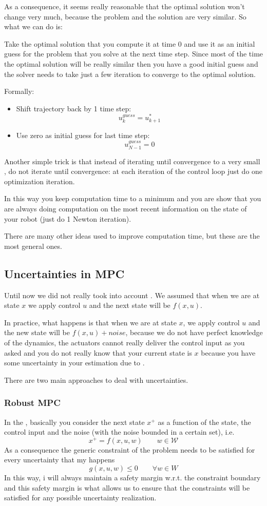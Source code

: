 As a consequence, it seems really reasonable that the optimal solution won't change very much, because the problem and the solution are very similar. So what we can do is:

Take the optimal solution that you compute it at time $0$ and use it as an initial guess for the problem that you solve at the next time step. Since most of the time the optimal solution will be really similar then you have a good initial guess and the solver needs to take just a few iteration to converge to the optimal solution.

Formally:
\begin{itemize}
\item Shift trajectory back by 1 time step:
\[u^{guess}_k = u^*_{k+1}\]
\item Use zero as initial guess for last time step:
\[u_{N-1}^{guess} = 0\]
\end{itemize}

Another simple trick is that instead of iterating until convergence to a very small , do not iterate until convergence: at each iteration of the control loop just do one optimization iteration.

In this way you keep computation time to a minimum and you are show that you are always doing computation on the most recent information on the state of your robot (just do 1 Newton iteration).

There are many other ideas used to improve computation time, but these are the most general ones.

\subsection{Uncertainties in MPC}
Until now we did not really took into account . We assumed that when we are at state $x$ we apply control $u$ and the next state will be $f(x,u)$.

In practice, what happens is that when we are at state $x$, we apply control $u$ and the new state will be $f(x,u) + noise$, because we do not have perfect knowledge of the dynamics, the actuators cannot really deliver the control input as you asked and you do not really know that your current state is $x$ because you have some uncertainty in your estimation due to .

There are two main approaches to deal with uncertainties.
\subsubsection{Robust MPC}
In the , basically you consider the next state $x^+$ as a function of the state, the control input and the noise (with the noise bounded in a certain set), i.e.
\[x^+ = f(x,u,w)\qquad w\in \mathcal{W}\]
As a consequence the generic constraint of the problem needs to be satisfied for every uncertainty that my happens
\[g(x,u,w)\le0\qquad \forall w\in W\]
In this way, i will always maintain a safety margin w.r.t. the constraint boundary and this safety margin is what allows us to ensure that the constraints will be satisfied for any possible uncertainty realization.

